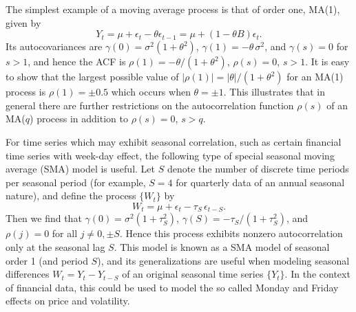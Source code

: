 \begin{ex} \label{ex:movingorder1}
The simplest example of a moving average process is that of order one, MA(1), given by
	\[
	Y_t = \mu + \epsilon_t - \theta \epsilon_{t-1}= \mu + (1 - \theta B) \epsilon_t.
	 \]
Its autocovariances are $\gamma(0)= \sigma^2 (1 + \theta^2)$, $\gamma(1)= -\theta\, \sigma^2$, and $\gamma(s)= 0$ for $s > 1$, and hence the ACF is $\rho(1)= -\theta / (1+\theta^2)$, $\rho(s)= 0$, $s > 1$. It is easy to show that the largest possible value of $\left| \rho(1) \right|= \left| \theta \right| / (1+\theta^2)$ for an  MA(1) process is $\rho(1)= \pm 0.5$ which occurs when $\theta = \pm 1$. This illustrates that in general there are further restrictions on the autocorrelation function $\rho(s)$ of an MA($q$)  process in addition to $\rho(s)= 0$, $s > q$. \xqed
\end{ex}
    

\begin{ex} \label{ex:seasonal} 
For time series which may exhibit seasonal correlation, such as certain financial time series with week-day effect, the following type of special seasonal moving average (SMA) model is useful. Let $S$ denote the number of discrete time periods per seasonal period (for example, $S= 4$ for quarterly data of an annual seasonal nature), and define the process $\{ W_t \}$ by
	\[	
	W_t = \mu + \epsilon_t - \tau_S \, \epsilon_{t-S}.
	\]
Then we find that $\gamma(0)= \sigma^2 (1+\tau_S^2)$, $\gamma(S) = - \tau_S / (1+\tau_S^2)$,  and $\rho(j)= 0$ for all $j \neq 0, \pm S$. Hence this process exhibits nonzero autocorrelation only at the seasonal lag $S$. This model is known as a SMA model of seasonal order 1 (and period $S$), and its generalizations are useful when modeling seasonal differences $W_t = Y_t - Y_{t-S}$ of an original seasonal time series $\{ Y_t \}$.  In the context of financial data, this could be used to model the so called Monday and Friday effects on price and volatility. \xqed
\end{ex}      


